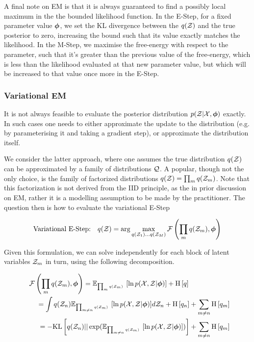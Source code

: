 A final note on EM is that it is always guaranteed to find a possibly local maximum in the the bounded likelihood function. In the E-Step, for a fixed parameter value ${ \bm \phi }$, we set the KL divergence between the $q({ \mathcal{Z} })$ and the true posterior to zero, increasing the bound such that its value exactly matches the likelihood. In the M-Step, we maximise the free-energy with respect to the parameter, such that it's greater than the previous value of the free-energy, which is less than the likelihood evaluated at that new parameter value, but which will be increased to that value once more in the E-Step.


\subsubsection{Variational EM}
It is not always feasible to evaluate the posterior distribution $p({ \mathcal{Z} }|{ \mathcal{X} }, { \bm \phi })$ exactly. In such cases one needs to either approximate the update to the distribution (e.g. by parameterising it and taking a gradient step), or approximate the distribution itself.

We consider the latter approach, where one assumes the true distribution $q({ \mathcal{Z} })$ can be approximated by a family of distributions ${ \mathcal{Q} }$. A popular, though not the only choice, is the family of factorized distributions $q({ \mathcal{Z} }) = \prod_m q({ \mathcal{Z} }_m)$. Note that this factorization is not derived from the IID principle, as the in prior discussion on EM, rather it is a modelling assumption to be made by the practitioner. The question then is how to evaluate the variational E-Step

\begin{align*}
\text{Variational E-Step:} & & q({ \mathcal{Z} }) = \arg \max_{q({ \mathcal{Z} }_1) \ldots q({ \mathcal{Z} }_M)} { \mathcal{F}\left( {\prod_m q({ \mathcal{Z} }_m), { \bm \phi }} \right) }
\end{align*}

Given this formulation, we can solve independently for each block of latent variables ${ \mathcal{Z} }_m$ in turn, using the following decomposition.

\begin{align*}
{ \mathcal{F}\left( {\prod_m q( { \mathcal{Z} } _m),  {  \bm \phi  } } \right) } 
 = { \mathbb{E}_{ { {{ \mbox{\tiny ${\prod_m q({ \mathcal{Z} }_m)}$ } }} } }\left[ { \ln { p( { \mathcal{X} } ,  { \mathcal{Z} } |  {  \bm \phi  } ) } } \right] } + \text{H} \left[ q \right] \qquad\qquad\qquad\\
\qquad = \int q({ \mathcal{Z} }_n) { \mathbb{E}_{ { {{ \mbox{\tiny ${\prod_{m\neq n} q({ \mathcal{Z} }_m)}$ } }} } }\left[ { \ln { p( { \mathcal{X} } ,  { \mathcal{Z} } |  {  \bm \phi  } ) } } \right] } d{ \mathcal{Z} }_n + \text{H} \left[ q_n \right] + \sum_{m\neq n} \text{H} \left[ q_m \right] \\
\qquad = -\text{KL}\left[q({ \mathcal{Z} }_n)||\exp({ \mathbb{E}_{ { {{ \mbox{\tiny ${\prod_{m\neq n} q({ \mathcal{Z} }_m)}$ } }} } }\left[ { \ln { p( { \mathcal{X} } ,  { \mathcal{Z} } |  {  \bm \phi  } ) } } \right] })\right] + \sum_{m\neq n} \text{H} \left[ q_m \right]
\end{align*}

